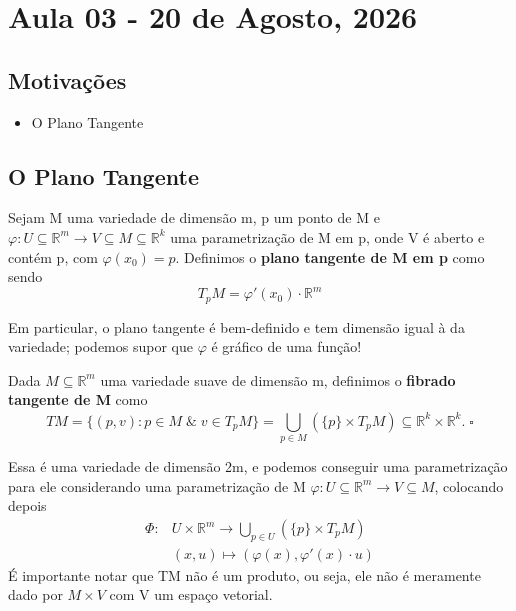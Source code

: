 \documentclass[../differential_topology.tex]{subfiles}
\begin{document}
\section{Aula 03 - 20 de Agosto, 2026}
\subsection{Motivações}
\begin{itemize}
	\item O Plano Tangente
\end{itemize}
\subsection{O Plano Tangente}
\begin{def*}
	Sejam M uma variedade de dimensão m, p um ponto de M e \(\varphi :U\subseteq \mathbb{R}^{m}\rightarrow V\subseteq M\subseteq \mathbb{R}^{k}\) uma parametrização de M em p, onde V é aberto e contém p, com \(\varphi(x_{0}) = p\). Definimos o \textbf{plano tangente de M em p} como sendo
	\[
		T_{p}M = \varphi'(x_{0})\cdot \mathbb{R}^{m}
	\]
\end{def*}
Em particular, o plano tangente é bem-definido e tem dimensão igual à da variedade; podemos supor que \(\varphi \) é gráfico de uma função!
\begin{def*}
	Dada \(M\subseteq \mathbb{R}^{m}\) uma variedade suave de dimensão m, definimos o \textbf{fibrado tangente de M} como
	\[
		TM = \{(p, v): p\in M\; \& \; v\in T_{p}M\} = \bigcup_{p\in M}^{}(\{p\} \times T_{p}M)\subseteq \mathbb{R}^{k}\times \mathbb{R}^{k}.\; \square
	\]
\end{def*}
Essa é uma variedade de dimensão 2m, e podemos conseguir uma parametrização para ele considerando uma parametrização de M \(\varphi :U\subseteq \mathbb{R}^{m}\rightarrow V\subseteq M\), colocando depois
\begin{align*}
	\Phi : & U\times \mathbb{R}^{m}\rightarrow \bigcup_{p\in U}^{}(\{p\}\times T_{p}M) \\
	       & (x, u)\longmapsto (\varphi (x), \varphi '(x)\cdot u)
\end{align*}
É importante notar que TM não é um produto, ou seja, ele não é meramente dado por \(M\times V\) com V um espaço vetorial.
\end{document}
